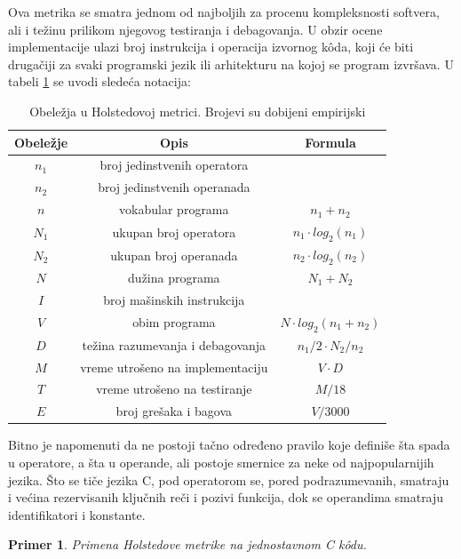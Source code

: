 \documentclass[a4paper]{article}
\newtheorem{primer}{Primer}[section]
\begin{document}
Ova metrika se smatra jednom od najboljih za procenu kompleksnosti softvera, ali i težinu prilikom njegovog testiranja i debagovanja. U obzir ocene implementacije ulazi broj instrukcija i operacija izvornog k\^{o}da, koji će biti drugačiji za svaki programski jezik ili arhitekturu na kojoj se program izvršava. U tabeli \ref{tabela:holsted} se uvodi sledeća notacija:
\begin{table}[h]
\centering
 \begin{tabular}{|c|c|c|}
  \hline
  Obeležje & Opis & Formula \\ [0ex]
  \hline $n_1$ & broj jedinstvenih operatora & \\ 
  \hline $n_2$ & broj jedinstvenih operanada & \\ 
  \hline $n$ & vokabular programa & $ n_1 + n_2 $ \\ 
  \hline $N_1$ & ukupan broj operatora & $ n_1 \cdot log_2(n_1) $ \\ 
  \hline $N_2$ & ukupan broj operanada & $ n_2 \cdot log_2(n_2) $ \\ 
  \hline $N$ & dužina programa & $ N_1 + N_2 $ \\
  \hline $I$ & broj mašinskih instrukcija & \\
  \hline $V$ & obim programa & $ N \cdot log_2(n_1+n_2) $ \\
  \hline $D$ & težina razumevanja i debagovanja & $ n_1/2 \cdot N_2 / n_2  $ \\
  \hline $M$ & vreme utrošeno na implementaciju & $ V \cdot D $ \\
  \hline $T$ & vreme utrošeno na testiranje & $ M / 18 $ \\
  \hline $E$ & broj grešaka i bagova & $ V / 3000 $ \\
  \hline
 \end{tabular}
 \caption{Obeležja u Holstedovoj metrici. Brojevi su dobijeni empirijski \cite{ibm_halstead}}
 \label{tabela:holsted} 
\end{table}

Bitno je napomenuti da ne postoji tačno određeno pravilo koje definiše šta spada u operatore, a šta u operande, ali postoje smernice za neke od najpopularnijih jezika. Što se tiče jezika C, pod operatorom se, pored podrazumevanih, smatraju i većina rezervisanih ključnih reči i pozivi funkcija, dok se operandima smatraju identifikatori i konstante.

\begin{primer}
Primena Holstedove metrike na jednostavnom C k\^{o}du. \cite{holsted_primer}
\end{primer}
\end{document}
